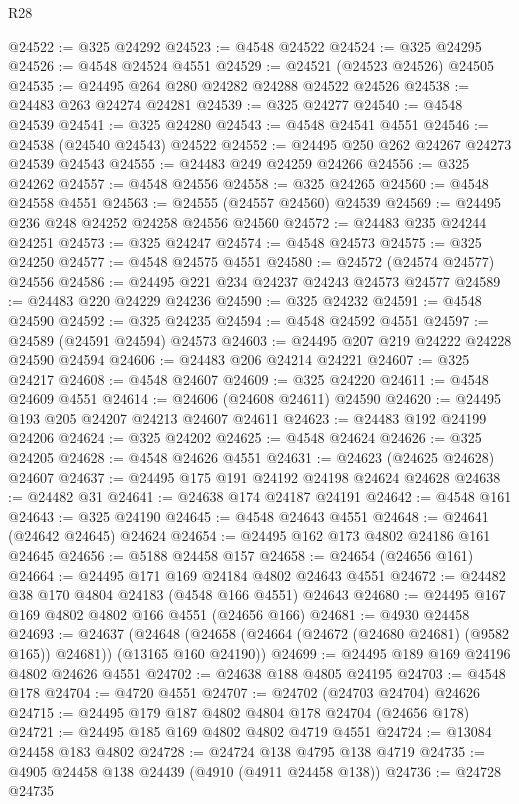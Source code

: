 \begin{lexlean}{R28}
\begin{coremodule}
@24522 := @325 @24292
@24523 := @4548 @24522
@24524 := @325 @24295
@24526 := @4548 @24524 @4551
@24529 := @24521 (@24523 @24526) @24505
@24535 := @24495 @264 @280 @24282 @24288 @24522 @24526
@24538 := @24483 @263 @24274 @24281
@24539 := @325 @24277
@24540 := @4548 @24539
@24541 := @325 @24280
@24543 := @4548 @24541 @4551
@24546 := @24538 (@24540 @24543) @24522
@24552 := @24495 @250 @262 @24267 @24273 @24539 @24543
@24555 := @24483 @249 @24259 @24266
@24556 := @325 @24262
@24557 := @4548 @24556
@24558 := @325 @24265
@24560 := @4548 @24558 @4551
@24563 := @24555 (@24557 @24560) @24539
@24569 := @24495 @236 @248 @24252 @24258 @24556 @24560
@24572 := @24483 @235 @24244 @24251
@24573 := @325 @24247
@24574 := @4548 @24573
@24575 := @325 @24250
@24577 := @4548 @24575 @4551
@24580 := @24572 (@24574 @24577) @24556
@24586 := @24495 @221 @234 @24237 @24243 @24573 @24577
@24589 := @24483 @220 @24229 @24236
@24590 := @325 @24232
@24591 := @4548 @24590
@24592 := @325 @24235
@24594 := @4548 @24592 @4551
@24597 := @24589 (@24591 @24594) @24573
@24603 := @24495 @207 @219 @24222 @24228 @24590 @24594
@24606 := @24483 @206 @24214 @24221
@24607 := @325 @24217
@24608 := @4548 @24607
@24609 := @325 @24220
@24611 := @4548 @24609 @4551
@24614 := @24606 (@24608 @24611) @24590
@24620 := @24495 @193 @205 @24207 @24213 @24607 @24611
@24623 := @24483 @192 @24199 @24206
@24624 := @325 @24202
@24625 := @4548 @24624
@24626 := @325 @24205
@24628 := @4548 @24626 @4551
@24631 := @24623 (@24625 @24628) @24607
@24637 := @24495 @175 @191 @24192 @24198 @24624 @24628
@24638 := @24482 @31
@24641 := @24638 @174 @24187 @24191
@24642 := @4548 @161
@24643 := @325 @24190
@24645 := @4548 @24643 @4551
@24648 := @24641 (@24642 @24645) @24624
@24654 := @24495 @162 @173 @4802 @24186 @161 @24645
@24656 := @5188 @24458 @157
@24658 := @24654 (@24656 @161)
@24664 := @24495 @171 @169 @24184 @4802 @24643 @4551
@24672 := @24482 @38 @170 @4804 @24183 (@4548 @166 @4551) @24643
@24680 := @24495 @167 @169 @4802 @4802 @166 @4551 (@24656 @166)
@24681 := @4930 @24458
@24693 := @24637
    (@24648 (@24658 (@24664 (@24672 (@24680 @24681) (@9582 @165)) @24681)) (@13165 @160 @24190))
@24699 := @24495 @189 @169 @24196 @4802 @24626 @4551
@24702 := @24638 @188 @4805 @24195
@24703 := @4548 @178
@24704 := @4720 @4551
@24707 := @24702 (@24703 @24704) @24626
@24715 := @24495 @179 @187 @4802 @4804 @178 @24704 (@24656 @178)
@24721 := @24495 @185 @169 @4802 @4802 @4719 @4551
@24724 := @13084 @24458 @183 @4802
@24728 := @24724 @138 @4795 @138 @4719
@24735 := @4905 @24458 @138 @24439 (@4910 (@4911 @24458 @138))
@24736 := @24728 @24735

\end{coremodule}
\end{lexlean}
